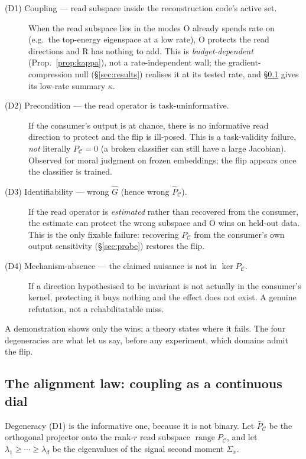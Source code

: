 \documentclass[11pt]{article}
\theoremstyle{remark}
\newcommand{\PC}{P_{\mathcal{C}}}
\newcommand{\PCbar}{\bar P_{\mathcal{C}}}
\newcommand{\Sx}{\Sigma_{x}}
\newcommand{\kalign}{\kappa}
\begin{document}
\begin{description}
\item[(D1) Coupling --- read subspace inside the reconstruction code's active set.] When
the read subspace lies in the modes O already spends rate on (e.g.\ the top-energy
eigenspace at a low rate), O protects the read directions and R has nothing to add. This is
\emph{budget-dependent} (Prop.~\ref{prop:kappa}), not a rate-independent wall; the
gradient-compression null (\S\ref{sec:results}) realises it at its tested rate, and
\S\ref{sec:kappa} gives its low-rate summary $\kalign$.
\item[(D2) Precondition --- the read operator is task-uninformative.] If the consumer's
output is at chance, there is no informative read direction to protect and the flip is
ill-posed. This is a task-validity failure, \emph{not} literally $\PC=0$ (a broken
classifier can still have a large Jacobian). Observed for moral judgment on frozen
embeddings; the flip appears once the classifier is trained.
\item[(D3) Identifiability --- wrong $\hat G$ (hence wrong $\hat\PC$).] If the read
operator is \emph{estimated} rather than recovered from the consumer, the estimate can
protect the wrong subspace and O wins on held-out data. This is the only fixable failure:
recovering $\PC$ from the consumer's own output sensitivity (\S\ref{sec:probe}) restores
the flip.
\item[(D4) Mechanism-absence --- the claimed nuisance is not in $\ker\PC$.] If a
direction hypothesised to be invariant is not actually in the consumer's kernel,
protecting it buys nothing and the effect does not exist. A genuine refutation, not a
rehabilitatable miss.
\end{description}

\noindent A demonstration shows only the wins; a theory states where it fails. The four
degeneracies are what let us say, before any experiment, which domains admit the flip.

\subsection{The alignment law: coupling as a continuous dial}\label{sec:kappa}

Degeneracy (D1) is the informative one, because it is not binary. Let $\PCbar$ be the
orthogonal projector onto the rank-$r$ read subspace $\operatorname{range}\PC$, and let
$\lambda_1\ge\cdots\ge\lambda_d$ be the eigenvalues of the signal second moment $\Sx$.
\end{document}
